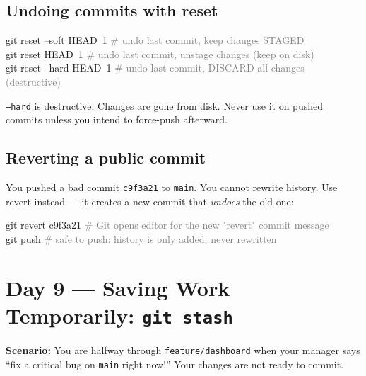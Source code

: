 \documentclass[10pt,a4paper]{article}
\newenvironment{codebox}{%
  \begin{mdframed}[backgroundcolor=codebg, linewidth=0pt,
    innerleftmargin=6pt, innerrightmargin=6pt,
    innertopmargin=4pt, innerbottommargin=4pt]%
  \small\ttfamily
}{%
  \end{mdframed}%
}
\newenvironment{warnbox}{%
  \begin{mdframed}[backgroundcolor=warnbg, linewidth=0.6pt,
    innerleftmargin=6pt, innerrightmargin=6pt,
    innertopmargin=3pt, innerbottommargin=3pt]%
  \small
}{%
  \end{mdframed}%
}
\newcommand{\cmd}[1]{\texttt{\small #1}}
\begin{document}
\subsection{Undoing commits with reset}
\vspace{0.5em}
\begin{codebox}
git reset --soft HEAD~1     \textcolor{gray}{\# undo last commit, keep changes STAGED}\\
git reset HEAD~1            \textcolor{gray}{\# undo last commit, unstage changes (keep on disk)}\\
git reset --hard HEAD~1     \textcolor{gray}{\# undo last commit, DISCARD all changes (destructive)}
\end{codebox}

\begin{warnbox}
\cmd{--hard} is destructive. Changes are gone from disk. Never use it on pushed commits
unless you intend to force-push afterward.
\end{warnbox}

\subsection{Reverting a public commit}

You pushed a bad commit \texttt{c9f3a21} to \texttt{main}. You cannot rewrite history.
Use revert instead --- it creates a new commit that \emph{undoes} the old one:

\begin{codebox}
git revert c9f3a21      \textcolor{gray}{\# Git opens editor for the new "revert" commit message}\\
git push                \textcolor{gray}{\# safe to push: history is only added, never rewritten}
\end{codebox}

\section{Day 9 --- Saving Work Temporarily: \texttt{git stash}}

\textbf{Scenario:} You are halfway through \texttt{feature/dashboard} when your manager says
``fix a critical bug on \texttt{main} right now!'' Your changes are not ready to commit.
\end{document}
